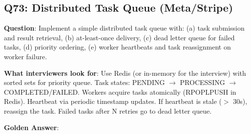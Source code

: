 \subsection{Q73: Distributed Task Queue (Meta/Stripe)}

\textbf{Question}: Implement a simple distributed task queue with: (a) task submission and result retrieval, (b) at-least-once delivery, (c) dead letter queue for failed tasks, (d) priority ordering, (e) worker heartbeats and task reassignment on worker failure.

\textbf{What interviewers look for}: Use Redis (or in-memory for the interview) with sorted sets for priority queue. Task states: PENDING $\to$ PROCESSING $\to$ COMPLETED/FAILED. Workers acquire tasks atomically (RPOPLPUSH in Redis). Heartbeat via periodic timestamp updates. If heartbeat is stale ($>$ 30s), reassign the task. Failed tasks after N retries go to dead letter queue.

\textbf{Golden Answer}:

